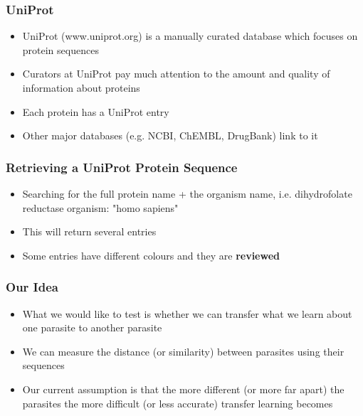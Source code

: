 \documentclass[compress]{beamer}
\begin{document}
\begin{frame}
\frametitle{UniProt} 
\begin{itemize}%
 \item UniProt (www.uniprot.org) is a manually curated database which focuses on protein sequences
 \item Curators at UniProt pay much attention to the amount and quality of information about proteins
 \item Each protein has a UniProt entry
 \item Other major databases (e.g. NCBI, ChEMBL, DrugBank) link to it
 
 \end{itemize}
\end{frame}


\begin{frame}
\frametitle{Retrieving a UniProt Protein Sequence} 
\begin{itemize}%
 \item Searching for the full protein name + the organism name, i.e. dihydrofolate reductase organism: "homo sapiens"
 \item This will return several entries
 \item Some entries have different colours and they are \textbf{reviewed}
 
 \end{itemize}
\end{frame}


\begin{frame}
\frametitle{Our Idea} 
\begin{itemize}%
 \item What we would like to test is whether we can transfer what we learn about one parasite to another parasite
 \item We can measure the distance (or similarity) between parasites using their sequences 
 \item Our current assumption is that the more different (or more far apart) the parasites the more difficult (or less accurate) transfer learning becomes
 
 \end{itemize}
\end{frame}
\end{document}
